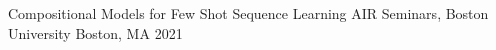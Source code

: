 \begin{cvhonors}


  \cvhonor
    {Compositional Models for Few Shot Sequence Learning} %
    {AIR Seminars, Boston University} %
    {Boston, MA} %
    {2021} %
    

\end{cvhonors}
